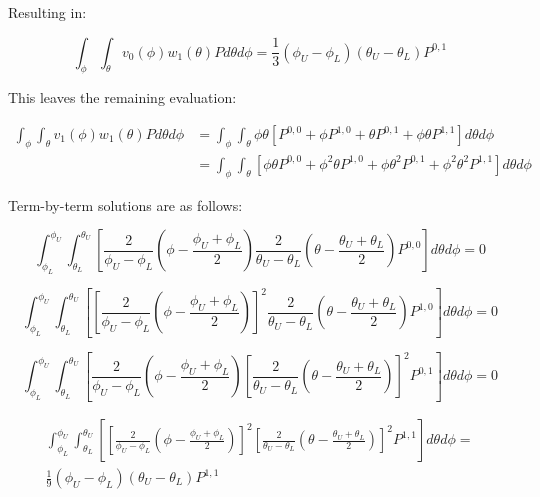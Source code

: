 \documentclass[12pt,a4paper,pagesize=pdftex]{scrartcl}
\begin{document}
Resulting in:

\begin{equation*}
    \int_\phi \int_\theta v_0\left(\phi\right) w_1\left(\theta\right) P d\theta d\phi = \boxed{\frac{1}{3}\left(\phi_U - \phi_L\right) \left(\theta_U - \theta_L\right) P^{0,1}}
\end{equation*}

This leaves the remaining evaluation:

\begin{align*}
    \int_\phi \int_\theta v_1\left(\phi\right) w_1\left(\theta\right) P d\theta d\phi & = \int_\phi \int_\theta \phi \theta \left[ P^{0,0} + \phi P^{1,0} + \theta P^{0,1} + \phi \theta P^{1,1}\right] d\theta d\phi \\
    & = \int_\phi \int_\theta \left[ \phi \theta P^{0,0} + \phi^2 \theta P^{1,0} + \phi \theta^2 P^{0,1} + \phi^2 \theta^2 P^{1,1}\right] d\theta d\phi
\end{align*}

Term-by-term solutions are as follows:

\begin{equation*}
    \int_{\phi_L}^{\phi_U} \int_{\theta_L}^{\theta_U} \left[ \frac{2}{\phi_U - \phi_L} \left(\phi - \frac{\phi_U + \phi_L}{2}\right) \frac{2}{\theta_U - \theta_L} \left(\theta - \frac{\theta_U + \theta_L}{2}\right) P^{0,0}\right] d\theta d\phi = 0
\end{equation*}

\begin{equation*}
    \int_{\phi_L}^{\phi_U} \int_{\theta_L}^{\theta_U} \left[ \left[\frac{2}{\phi_U - \phi_L} \left(\phi - \frac{\phi_U + \phi_L}{2}\right)\right]^2 \frac{2}{\theta_U - \theta_L} \left(\theta - \frac{\theta_U + \theta_L}{2}\right) P^{1,0}\right] d\theta d\phi = 0
\end{equation*}

\begin{equation*}
    \int_{\phi_L}^{\phi_U} \int_{\theta_L}^{\theta_U} \left[ \frac{2}{\phi_U - \phi_L} \left(\phi - \frac{\phi_U + \phi_L}{2}\right) \left[\frac{2}{\theta_U - \theta_L} \left(\theta - \frac{\theta_U + \theta_L}{2}\right) \right]^2 P^{0,1}\right] d\theta d\phi = 0
\end{equation*}

\begin{multline*}
    \int_{\phi_L}^{\phi_U} \int_{\theta_L}^{\theta_U} \left[ \left[\frac{2}{\phi_U - \phi_L} \left(\phi - \frac{\phi_U + \phi_L}{2}\right)\right]^2 \left[\frac{2}{\theta_U - \theta_L} \left(\theta - \frac{\theta_U + \theta_L}{2}\right)\right]^2 P^{1,1}\right] d\theta d\phi = \\ \frac{1}{9} \left(\phi_U - \phi_L\right) \left(\theta_U - \theta_L\right) P^{1,1}
\end{multline*}
\end{document}
